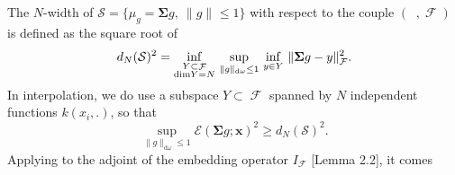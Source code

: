 \documentclass[twoside,11pt]{book}
\numberwithin{theorem}{chapter}
\numberwithin{definition}{chapter}
\numberwithin{proposition}{chapter}
\numberwithin{corollary}{chapter}
\numberwithin{example}{chapter}
\numberwithin{lemma}{chapter}
\DeclareMathOperator{\F}{\mathcal{F}}
\DeclareMathOperator{\Ltwo}{\mathbb{L}_{2}(\mathrm{d} \omega)}
\newcommand{\rb}[1]{\textcolor{magenta}{#1}}
\begin{document}
 The $N$-width of $\mathcal{S} = \{ \mu_{g} = \bm{\bm{\Sigma}}g, \: \|g\|_{\Ltwo} \leq 1\}$ with respect to the couple $(\Ltwo, \F)$ \citep[Chapter 1.7]{Pin12} is defined as the square root of
\begin{equation}
	d_{N}(\mathcal{S})^{2}  = \inf\limits_{\substack{Y \subset \F\\ \mathrm{dim}Y = N}}\, \sup\limits_{\|g\|_{\mathrm{d}\omega} \leq 1}\, \inf\limits_{y \in Y}\, \|\bm{\Sigma} g -y \|_{\F}^{2}. \nonumber \\
\end{equation}
In interpolation, we do use a subspace $Y \subset \F$ spanned by $N$ independent functions $k(x_{i},.)$, so that
\begin{equation}
\sup\limits_{\|g\|_{\mathrm{d}\omega} \leq 1} \mathcal{E}(\bm{\Sigma} g;\bm{x})^{2} \geq d_{N}(\mathcal{S})^{2}.
\end{equation}
Applying \citep[Theorem 2.2, Chapter 4]{Pin12} to the adjoint of the embedding operator $I_{\F}$ \cite{StSc12}[Lemma 2.2], it comes
%
\end{document}
